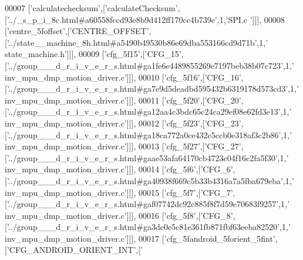 \begin{DoxyCode}
00007   [\textcolor{stringliteral}{'calculatechecksum'},[\textcolor{stringliteral}{'calculateChecksum'},[\textcolor{stringliteral}{'../\_s\_p\_i\_8c.html#a60558fccd93e8b9d412ff170cc4b739e'},1,\textcolor{stringliteral}{'SPI.c
      '}]]],
00008   [\textcolor{stringliteral}{'centre\_5foffset'},[\textcolor{stringliteral}{'CENTRE\_OFFSET'},[\textcolor{stringliteral}{'../state\_\_machine\_8h.html#a5490b49530b86e69dba553166cd9d71b'},1,\textcolor{stringliteral}{'
      state\_machine.h'}]]],
00009   [\textcolor{stringliteral}{'cfg\_5f15'},[\textcolor{stringliteral}{'CFG\_15'},[\textcolor{stringliteral}{'../group\_\_\_d\_r\_i\_v\_e\_r\_s.html#ga1fe6e4489855269e7197beb38b07c723'},1,\textcolor{stringliteral}{'
      inv\_mpu\_dmp\_motion\_driver.c'}]]],
00010   [\textcolor{stringliteral}{'cfg\_5f16'},[\textcolor{stringliteral}{'CFG\_16'},[\textcolor{stringliteral}{'../group\_\_\_d\_r\_i\_v\_e\_r\_s.html#ga7e9d5deadbd595432b6319178d573cd3'},1,\textcolor{stringliteral}{'
      inv\_mpu\_dmp\_motion\_driver.c'}]]],
00011   [\textcolor{stringliteral}{'cfg\_5f20'},[\textcolor{stringliteral}{'CFG\_20'},[\textcolor{stringliteral}{'../group\_\_\_d\_r\_i\_v\_e\_r\_s.html#ga12aa4c3bdc65c24ca29ef08e62fd3e13'},1,\textcolor{stringliteral}{'
      inv\_mpu\_dmp\_motion\_driver.c'}]]],
00012   [\textcolor{stringliteral}{'cfg\_5f23'},[\textcolor{stringliteral}{'CFG\_23'},[\textcolor{stringliteral}{'../group\_\_\_d\_r\_i\_v\_e\_r\_s.html#ga18ca772a0ce432c5ccb0e318af3c2b86'},1,\textcolor{stringliteral}{'
      inv\_mpu\_dmp\_motion\_driver.c'}]]],
00013   [\textcolor{stringliteral}{'cfg\_5f27'},[\textcolor{stringliteral}{'CFG\_27'},[\textcolor{stringliteral}{'../group\_\_\_d\_r\_i\_v\_e\_r\_s.html#gaae53afa64170cb4723c04f16c2fa5f30'},1,\textcolor{stringliteral}{'
      inv\_mpu\_dmp\_motion\_driver.c'}]]],
00014   [\textcolor{stringliteral}{'cfg\_5f6'},[\textcolor{stringliteral}{'CFG\_6'},[\textcolor{stringliteral}{'../group\_\_\_d\_r\_i\_v\_e\_r\_s.html#ga40938f669c5b33b4316a7a5fba679eba'},1,\textcolor{stringliteral}{'
      inv\_mpu\_dmp\_motion\_driver.c'}]]],
00015   [\textcolor{stringliteral}{'cfg\_5f7'},[\textcolor{stringliteral}{'CFG\_7'},[\textcolor{stringliteral}{'../group\_\_\_d\_r\_i\_v\_e\_r\_s.html#gaf07742dc92c885f8f7d59e70683f9257'},1,\textcolor{stringliteral}{'
      inv\_mpu\_dmp\_motion\_driver.c'}]]],
00016   [\textcolor{stringliteral}{'cfg\_5f8'},[\textcolor{stringliteral}{'CFG\_8'},[\textcolor{stringliteral}{'../group\_\_\_d\_r\_i\_v\_e\_r\_s.html#ga3dc0e5c81e361fb871fbf63eeba82520'},1,\textcolor{stringliteral}{'
      inv\_mpu\_dmp\_motion\_driver.c'}]]],
00017   [\textcolor{stringliteral}{'cfg\_5fandroid\_5forient\_5fint'},[\textcolor{stringliteral}{'CFG\_ANDROID\_ORIENT\_INT'},[\textcolor{stringliteral}{'
}
\end{DoxyCode}
